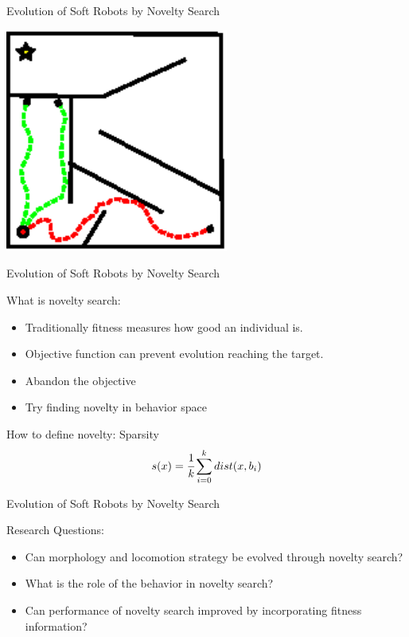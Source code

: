 \documentclass[6pt]{beamer}
\begin{document}
\begin{frame}{{\scriptsize Evolution of Soft Robots by} Novelty Search}
\begin{center}
\includegraphics[width=0.55\textwidth]{../Figures/Misc/maze4.eps}
\end{center}
\end{frame}

\begin{frame}{{\scriptsize Evolution of Soft Robots by} Novelty Search}
\begin{block}{What is novelty search:}
\begin{itemize}
\item Traditionally fitness measures how good an individual is.
\item Objective function can prevent evolution reaching the target.
\item Abandon the objective
\item Try finding novelty in behavior space
\end{itemize}
\end{block}
\begin{block}{How to define novelty: Sparsity}
\begin{equation*}
s(x) = \cfrac{1}{k} \sum_{i=0}^k dist(x, b_i)
\end{equation*}
\end{block}
\end{frame}

\begin{frame}{Evolution of Soft Robots by Novelty Search}
\begin{block}{Research Questions:}
\begin{itemize}
\item Can morphology and locomotion strategy be evolved through novelty search?
\item What is the role of the behavior in novelty search?
\item Can performance of novelty search improved by incorporating fitness information?
\end{itemize}
\end{block}
\end{frame}
\end{document}
